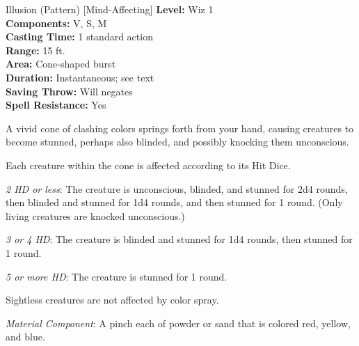 {Illusion (Pattern) [Mind-Affecting]}
{
	\textbf{Level:}
	Wiz 1\\
	\textbf{Components:}
	V, S, M\\
	\textbf{Casting Time:}
	1 standard action\\
	\textbf{Range:}
	15 ft.\\
	\textbf{Area:}
	Cone-shaped burst\\
	\textbf{Duration:}
	Instantaneous; see text\\
	\textbf{Saving Throw:}
	Will negates\\
	\textbf{Spell Resistance:}
	Yes\\
}
{
	A vivid cone of clashing colors springs forth from your hand, causing creatures to become stunned, perhaps also blinded, and possibly knocking them unconscious.

	Each creature within the cone is affected according to its Hit Dice.

	\textit{2 HD or less}:
	The creature is unconscious, blinded, and stunned for 2d4 rounds, then blinded and stunned for 1d4 rounds, and then stunned for 1 round. (Only living creatures are knocked unconscious.)

	\textit{3 or 4 HD}:
	The creature is blinded and stunned for 1d4 rounds, then stunned for 1 round.

	\textit{5 or more HD}:
	The creature is stunned for 1 round.

	Sightless creatures are not affected by color spray.

	\textit{Material Component}:
	A pinch each of powder or sand that is colored red, yellow, and blue.

}
